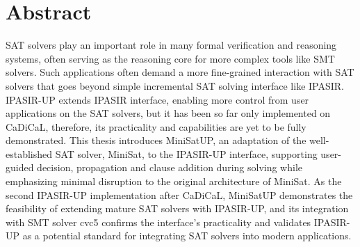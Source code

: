\chapter*{Abstract}

SAT solvers play an important role in many formal verification and reasoning systems, often serving as the reasoning core for more complex tools like SMT solvers. Such applications often demand a more fine-grained interaction with SAT solvers that goes beyond simple incremental SAT solving interface like IPASIR. IPASIR-UP extends IPASIR interface, enabling more control from user applications on the SAT solvers, but it has been so far only implemented on CaDiCaL, therefore, its practicality and capabilities are yet to be fully demonstrated. This thesis introduces MiniSatUP, an adaptation of  the well-established SAT solver, MiniSat, to the IPASIR-UP interface, supporting user-guided decision, propagation and clause addition during solving while emphasizing minimal disruption to the original architecture of MiniSat. As the second IPASIR-UP implementation after CaDiCaL, MiniSatUP demonstrates the feasibility of extending mature SAT solvers with IPASIR-UP, and its integration with SMT solver cvc5 confirms the interface's practicality and validates IPASIR-UP as a potential standard for integrating SAT solvers into modern applications.
